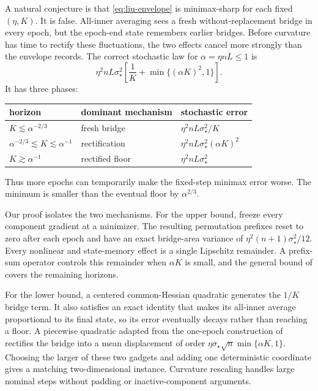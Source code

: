\documentclass{article}
\theoremstyle{remark}
\newcommand{\1}{\mathbf 1}
\begin{document}
A natural conjecture is that \eqref{eq:liu-envelope} is minimax-sharp for each fixed $(\eta,K)$. It is false. All-inner averaging sees a fresh without-replacement bridge in every epoch, but the epoch-end state remembers earlier bridges. Before curvature has time to rectify these fluctuations, the two effects cancel more strongly than the envelope records. The correct stochastic law for $\alpha=\eta nL\leq1$ is
\begin{equation}
 \eta^2nL\sigma_\star^2
 \left[\frac1K+\min\{(\alpha K)^2,1\}\right].       \label{eq:small-law}
\end{equation}
It has three phases:
\begin{center}
\begin{tabular}{@{}lll@{}}
\toprule
horizon & dominant mechanism & stochastic error \\
\midrule
$K\lesssim\alpha^{-2/3}$ & fresh bridge
  & $\eta^2nL\sigma_\star^2/K$ \\
$\alpha^{-2/3}\lesssim K\lesssim\alpha^{-1}$ & rectification
  & $\eta^2nL\sigma_\star^2(\alpha K)^2$ \\
$K\gtrsim\alpha^{-1}$ & rectified floor
  & $\eta^2nL\sigma_\star^2$ \\
\bottomrule
\end{tabular}
\end{center}
Thus more epochs can temporarily make the fixed-step minimax error worse. The minimum is smaller than the eventual floor by $\alpha^{2/3}$.

Our proof isolates the two mechanisms. For the upper bound, freeze every component gradient at a minimizer. The resulting permutation prefixes reset to zero after each epoch and have an exact bridge-area variance of $\eta^2(n+1)\sigma_\star^2/12$. Every nonlinear and state-memory effect is a single Lipschitz remainder. A prefix-sum operator controls this remainder when $\alpha K$ is small, and the general bound of \citet{liu2026dominates} covers the remaining horizons.

For the lower bound, a centered common-Hessian quadratic generates the $1/K$ bridge term. It also satisfies an exact identity that makes its all-inner average proportional to its final state, so its error eventually decays rather than reaching a floor. A piecewise quadratic adapted from the one-epoch construction of \citet{cha2023tighter} rectifies the bridge into a mean displacement of order $\eta\sigma_\star\sqrt n\min\{\alpha K,1\}$. Choosing the larger of these two gadgets and adding one deterministic coordinate gives a matching two-dimensional instance. Curvature rescaling handles large nominal steps without padding or inactive-component arguments.
\end{document}
